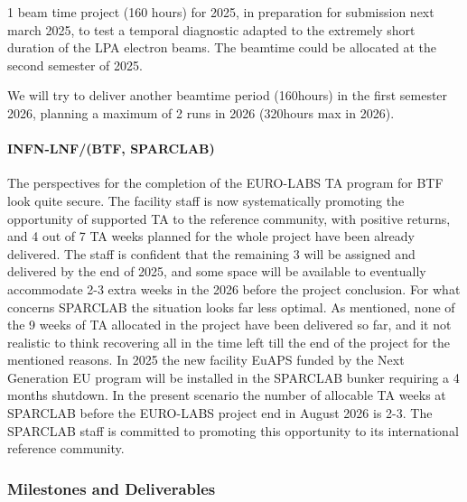 {1 beam time project (160 hours) for 2025, in preparation for submission next march 2025, to test a temporal diagnostic adapted to the extremely short duration of the LPA electron beams. The beamtime could be allocated at the second semester of 2025.

We will try to deliver another beamtime period (160hours) in the first semester 2026, planning a maximum of 2 runs in 2026 (320hours max in 2026).

\paragraph{INFN-LNF/(BTF, SPARCLAB)}

The perspectives for the completion of the EURO-LABS TA program for BTF look quite secure. The facility staff is now systematically promoting the opportunity of supported TA to the reference community, with positive returns, and 4 out of 7 TA weeks planned for the whole project have been already delivered. The staff is confident that the remaining 3 will be assigned and delivered by the end of 2025, and some space will be available to eventually accommodate 2-3 extra weeks in the 2026 before the project conclusion.
For what concerns SPARCLAB the situation looks far less optimal. As mentioned, none of the 9 weeks of TA allocated in the project have been delivered so far, and it not realistic to think recovering all in the time left till the end of the project for the mentioned reasons. In 2025 the new facility EuAPS funded by the Next Generation EU program will be installed in the SPARCLAB bunker requiring a 4 months shutdown. In the present scenario the number of allocable TA weeks at SPARCLAB before the EURO-LABS project end in August 2026 is 2-3. The SPARCLAB staff is committed to promoting this opportunity to its international reference community.

\subsubsection*{Milestones and Deliverables}


}
